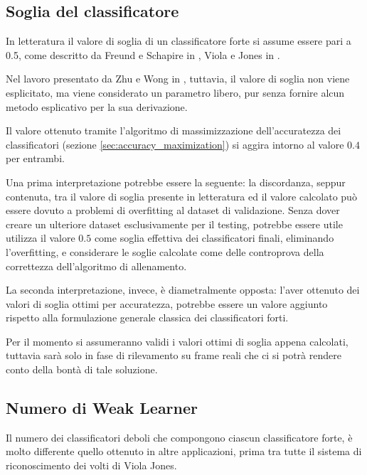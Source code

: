             \subsection{Soglia del classificatore} %
            \label{sub:soglia_del_classificatore}            
                In letteratura il valore di soglia di un classificatore forte si assume essere pari a 0.5, come descritto da Freund e Schapire in \cite{Freund97}, Viola e Jones in \cite{Viola04}.

                Nel lavoro presentato da Zhu e Wong in \cite{Zhu13}, tuttavia, il valore di soglia non viene esplicitato, ma viene considerato un parametro libero, pur senza fornire alcun metodo esplicativo per la sua derivazione.

                Il valore ottenuto tramite l'algoritmo di massimizzazione dell'accuratezza dei classificatori (sezione \ref{sec:accuracy_maximization}) si aggira intorno al valore $0.4$ per entrambi.
                
                Una prima interpretazione potrebbe essere la seguente: la discordanza, seppur contenuta, tra il valore di soglia presente in letteratura ed il valore calcolato può essere dovuto a problemi di overfitting al dataset di validazione.
                Senza dover creare un ulteriore dataset esclusivamente per il testing, potrebbe essere utile utilizza il valore $0.5$ come soglia effettiva dei classificatori finali, eliminando l'overfitting, e considerare le soglie calcolate come delle controprova della correttezza dell'algoritmo di allenamento.

                La seconda interpretazione, invece, è diametralmente opposta: l'aver ottenuto dei valori di soglia ottimi per accuratezza, potrebbe essere un valore aggiunto rispetto alla formulazione generale classica dei classificatori forti.

                Per il momento si assumeranno validi i valori ottimi di soglia appena calcolati, tuttavia sarà solo in fase di rilevamento su frame reali che ci si potrà rendere conto della bontà di tale soluzione.

            \subsection{Numero di Weak Learner} %
            \label{sub:numero_di_weak_learner}
                Il numero dei classificatori deboli che compongono ciascun classificatore forte, è molto differente quello ottenuto in altre applicazioni, prima tra tutte il sistema di riconoscimento dei volti di Viola Jones.


